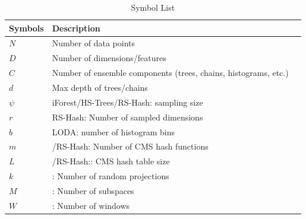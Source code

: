 \begin{table}[ht!]
	\caption{Symbol List}
	\centering
	\begin{tabular}{lll}
		\toprule
		\textbf{Symbols} & \textbf{Description}	\\	\hline
		$N$ & Number of data points	\\	\hline
		$D$ & Number of dimensions/features	\\	\hline
		$C$ & Number of ensemble components (trees, chains, histograms, etc.)	\\	\hline
		$d$ & Max depth of trees/chains	\\	\hline
		$\psi$ & iForest/HS-Trees/RS-Hash: sampling size	\\	\hline
		$r$ & RS-Hash: Number of sampled dimensions	\\
		$b$ & LODA: number of histogram bins	\\	\hline
		$m$ & \method/RS-Hash: Number of CMS hash functions	\\
		$L$ & \method/RS-Hash:: CMS hash table size	\\	\hline
		$k$ & \method: Number of random projections	\\
		$M$ & \method: Number of subspaces	\\
		$W$ & \method: Number of windows	\\
		\bottomrule
	\end{tabular}

\end{table}

